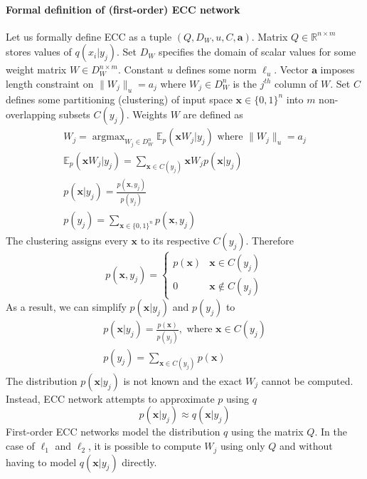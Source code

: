 \documentclass[12pt]{article}
\DeclareMathOperator*{\argmax}{argmax}
\begin{document}
\paragraph{Formal definition of (first-order) ECC network}
Let us formally define ECC as a tuple $(Q,D_W,u,C,\boldsymbol{a})$. Matrix $Q\in \mathbb{R}^{n\times m}$ stores values of $q(x_i|y_j)$. Set $D_W$ specifies the domain of scalar values for some weight matrix $W\in D_W^{n \times m}$. Constant $u$ defines some norm $\ell_u$.  Vector $\boldsymbol{a}$ imposes length constraint on $\lVert W_j \rVert_u=a_j$ where $W_j\in D_W^n$ is the $j^{th}$ column of $W$. Set $C$ defines some partitioning (clustering) of input space $\boldsymbol{x}\in \{0,1\}^n$ into $m$ non-overlapping subsets $C(y_j) $.
Weights $W$ are defined as
\begin{gather*}
	W_j = \argmax_{W_j\in D_W^{n}} \mathbb{E}_p(\boldsymbol{x}W_j|y_j)\text{ where } \lVert W_j \rVert_u=a_j \\
	\mathbb{E}_p(\boldsymbol{x}W_j|y_j) = \sum_{\boldsymbol{x}\in C(y_j)}\boldsymbol{x}W_jp(\boldsymbol{x}|y_j) \\ 
	p(\boldsymbol{x}|y_j) = \frac{p(\boldsymbol{x},y_j)}{p(y_j)} \\
	p(y_j) =  \sum_{\boldsymbol{x}\in \{0,1\}^n}p(\boldsymbol{x},y_j)
\end{gather*}
The clustering assigns every $\boldsymbol{x}$ to its respective $C(y_j)$. Therefore 
\[
p(\boldsymbol{x},y_j) = \begin{cases}
	p(\boldsymbol{x}) & \boldsymbol{x} \in C(y_j) \\
	0 & \boldsymbol{x} \notin C(y_j)
\end{cases}
\]
As a result, we can simplify $p(\boldsymbol{x}|y_j)$ and $p(y_j)$ to
\begin{gather*}
p(\boldsymbol{x}|y_j) = \frac{p(\boldsymbol{x})}{p(y_j)}, \text{ where  }\boldsymbol{x} \in C(y_j)\\
p(y_j) =  \sum_{\boldsymbol{x}\in C(y_j)}p(\boldsymbol{x})
\end{gather*}
The distribution $p(\boldsymbol{x}|y_j)$ is not known and the exact $W_j$ cannot be computed. Instead, ECC network attempts to approximate $p$ using $q$ 
\[
p(\boldsymbol{x}|y_j) \approx q(\boldsymbol{x}|y_j)
\]
First-order ECC networks model the distribution $q$ using the matrix $Q$. 
In the case of $\ell_1$ and $\ell_2$, it is possible to compute $W_j$ using only  $Q$ and without having to model $q(\boldsymbol{x}|y_j)$ directly.
\end{document}

